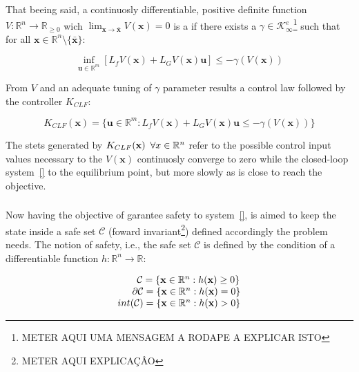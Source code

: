 That beeing said, a continuosly differentiable, positive definite function \( V: \mathbb{R}^n \rightarrow \mathbb{R}_{\geq 0}  \) wich \( \lim_{\mathbf{x} \to \bar{\mathbf{x}}}{V(\mathbf{x})} = 0 \) is a  if there exists a \( \gamma \in \mathcal{K}^e_{\infty}  \)\footnote{METER AQUI UMA MENSAGEM A RODAPE A EXPLICAR ISTO}  such that for all \( \mathbf{x} \in \mathbb{R}^n \setminus \{\bar{\mathbf{x}}\} \):

\begin{equation}
 \inf_{\mathbf{u} \in \mathbb{R}^m} [L_fV(\mathbf{x}) + L_GV(\mathbf{x})\mathbf{u}] \leq -\gamma(V(\mathbf{x}))
 \label{eq:CLF}
\end{equation}

From  \(V\) and an adequate tuning of \( \gamma \) parameter results a control law followed by the controller \(K_{CLF}\):

\begin{equation}
 K_{CLF}(\mathbf{x}) = \{ \mathbf{u} \in \mathbb{R}^m: L_fV(\mathbf{x}) + L_GV(\mathbf{x})\mathbf{u} \leq -\gamma(V(\mathbf{x})) \}
 \label{eq:K-CLF}
\end{equation}

The stets generated by \(K_{CLF}(\mathbf{x}) \hspace{0.5em} \forall x \in \mathbb{R}^n \) refer to the possible control input values necessary to the  \(V(\mathbf{x})\) continuosly converge to zero while the closed-loop system~\ref{} to the equilibrium point, but more slowly as is close to reach the objective.


\subsubsection{}
\label{subsub:control_barrier_function}

Now having the objective of garantee safety to system~\ref{}, is aimed to keep the state inside a safe set \(\mathcal{C}\) (foward invariant\footnote{METER AQUI EXPLICAÇÂO}) defined accordingly the problem needs. The notion of safety, i.e., the safe set \(\mathcal{C}\) is defined by the condition of a differentiable function \( h: \mathbb{R}^n \rightarrow \mathbb{R}  \):

\begin{equation}
    \begin{array}{l}
        \qquad   \mathcal{C} = \{ \mathbf{x} \in \mathbb{R}^n : h( \mathbf{x} )\geq 0\} \\
        \qquad \hspace{-0.5em}  \partial\mathcal{C} = \{ \mathbf{x} \in \mathbb{R}^n : h( \mathbf{x} ) = 0\} \\
        int(\mathcal{C}) = \{ \mathbf{x} \in \mathbb{R}^n : h( \mathbf{x} ) > 0\}
    \end{array}
 \label{eq:safe-set}
\end{equation}


